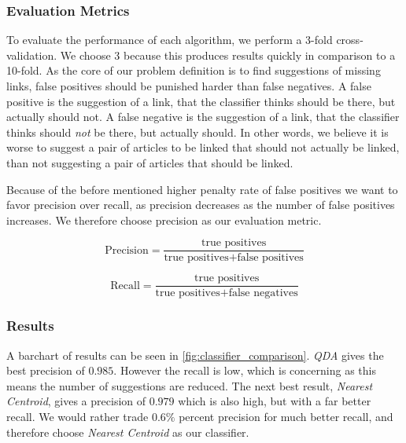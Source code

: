 \subsubsection{Evaluation Metrics}\label{evaluation_metric}
To evaluate the performance of each algorithm, we perform a 3-fold cross-validation. We choose 3 because this produces results quickly in comparison to a 10-fold. As the core of our problem definition is to find suggestions of missing links, false positives should be punished harder than false negatives. A false positive is the suggestion of a link, that the classifier thinks should be there, but actually should not. A false negative is the suggestion of a link, that the classifier thinks should \emph{not} be there, but actually should. In other words, we believe it is worse to suggest a pair of articles to be linked that should not actually be linked, than not suggesting a pair of articles that should be linked. 

Because of the before mentioned higher penalty rate of false positives we want to favor precision over recall, as precision decreases as the number of false positives increases. We therefore choose precision as our evaluation metric.

\begin{equation}\label{eq:precision}
\text{Precision} = \frac{\text{true positives}}{\text{true positives} + \text{false positives}}
\end{equation}

\begin{equation}\label{eq:recall}
\text{Recall} = \frac{\text{true positives}}{\text{true positives} + \text{false negatives}}
\end{equation}


\subsubsection{Results}
A barchart of results can be seen in \cref{fig:classifier_comparison}. \emph{QDA} gives the best precision of $0.985$. However the recall is low, which is concerning as this means the number of suggestions are reduced. The next best result, \emph{Nearest Centroid}, gives a precision of $0.979$ which is also high, but with a far better recall. We would rather trade $0.6\%$ percent precision for much better recall, and therefore choose \emph{Nearest Centroid} as our classifier.

